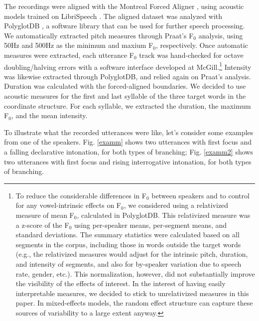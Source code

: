 \documentclass[preprint,review,12pt,authoryear,times]{elsarticle}
\begin{document}
The recordings were aligned with the Montreal Forced Aligner \citep{mcauliffeetal17}, using acoustic models trained on LibriSpeech \citep{librispeech}. The aligned dataset was analyzed with PolyglotDB \citep{polyglotdb}, a software library that can be used for further speech processing. We automatically extracted pitch measures through Praat's F$_0$ analysis, using 50Hz and 500Hz as the minimum and maxium F$_0$, respectively. Once automatic measures were extracted, each utterance F$_0$ track was hand-checked for octave doubling/halving errors with a software interface developed at McGill.\footnote{To reduce the considerable differences in F$_0$ between speakers and to control for any vowel-intrinsic effects on F$_0$, we considered using a relativized measure of mean F$_0$, calculated  in PolyglotDB.  This relativized measure was a z-score of the F$_0$ using per-speaker means, per-segment means, and standard deviations.  The summary statistics were calculated based on all segments in the corpus, including those in words outside the target words (e.g., the relativized measures would adjust for the intrinsic pitch, duration, and intensity of segments, and also for by-speaker variation due to speech rate, gender, etc.). This normalization, however, did not substantially improve the visibility of the effects of interest. In the interest of having easily interpretable measures, we decided to stick to unrelativized measures in this paper. In mixed-effects models, the random effect structure can capture these sources of variability to a large extent anyway.}  Intensity was likewise extracted through PolyglotDB, and relied again on Praat's analysis. Duration was calculated with the forced-aligned boundaries.  We decided to use acoustic measures for the first and last syllable of the three target words in the coordinate structure. For each syllable, we extracted the duration, the maximum F$_0$, and the mean intensity. 

To illustrate what the recorded utterances were like, let's consider some examples from one of the speakers.  Fig. \ref{examm} shows two utterances with first focus and a falling declarative intonation, for both types of branching;  Fig. \ref{examm2}  shows two utterances with first focus and rising interrogative intonation, for both types of branching. 
\end{document}
